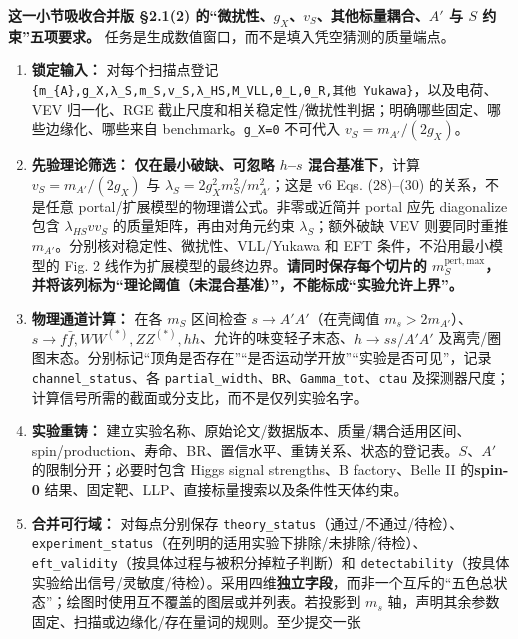 \documentclass[
]{article}
\providecommand{\tightlist}{%
  \setlength{\itemsep}{0pt}\setlength{\parskip}{0pt}}
\begin{document}
\textbf{这一小节吸收合并版 §2.1(2)
的``微扰性、\(g_X\)、\(v_S\)、其他标量耦合、\(A'\) 与 \(S\)
约束''五项要求。} 任务是生成数值窗口，而不是填入凭空猜测的质量端点。

\begin{enumerate}
\def\labelenumi{\arabic{enumi}.}
\tightlist
\item
  \textbf{锁定输入：} 对每个扫描点登记
  \texttt{\{m\_\{A\textquotesingle{}\},g\_X,λ\_S,m\_S,v\_S,λ\_HS,M\_VLL,θ\_L,θ\_R,其他\ Yukawa\}}，以及电荷、VEV
  归一化、RGE
  截止尺度和相关稳定性/微扰性判据；明确哪些固定、哪些边缘化、哪些来自
  benchmark。\texttt{g\_X=0} 不可代入 \(v_S=m_{A\prime}/(2g_X)\)。
\item
  \textbf{先验理论筛选：} \textbf{仅在最小破缺、可忽略 \(h\)--\(s\)
  混合基准下}，计算 \(v_S=m_{A'}/(2g_X)\) 与
  \(\lambda_S=2g_X^2m_S^2/m_{A'}^2\)；这是 v6 Eqs. (28)--(30)
  的关系，不是任意 portal/扩展模型的物理谱公式。非零或近简并 portal 应先
  diagonalize 包含 \(\lambda_{HS}vv_S\) 的质量矩阵，再由对角元约束
  \(\lambda_S\)；额外破缺 VEV 则要同时重推
  \(m_{A'}\)。分别核对稳定性、微扰性、VLL/Yukawa 和 EFT
  条件，不沿用最小模型的 Fig. 2
  线作为扩展模型的最终边界。\textbf{请同时保存每个切片的
  \(m_S^{\mathrm{pert,max}}\)，并将该列标为``理论阈值（未混合基准）''，不能标成``实验允许上界''。}
\item
  \textbf{物理通道计算：} 在各 \(m_S\) 区间检查 \(s\to A'A'\)（在壳阈值
  \(m_s>2m_{A'}\)）、\(s\to f\bar f,WW^{(*)},ZZ^{(*)},hh\)、允许的味变轻子末态、\(h\to ss/A'A'\)
  及离壳/圈图末态。分别标记``顶角是否存在''``是否运动学开放''``实验是否可见''，记录
  \texttt{channel\_status}、各
  \texttt{partial\_width}、\texttt{BR}、\texttt{Gamma\_tot}、\texttt{ctau}
  及探测器尺度；计算信号所需的截面或分支比，而不是仅列实验名字。
\item
  \textbf{实验重铸：}
  建立实验名称、原始论文/数据版本、质量/耦合适用区间、spin/production、寿命、BR、置信水平、重铸关系、状态的登记表。\(S\)、\(A'\)
  的限制分开；必要时包含 Higgs signal strengths、B factory、Belle II
  的\textbf{spin-0} 结果、固定靶、LLP、直接标量搜索以及条件性天体约束。
\item
  \textbf{合并可行域：} 对每点分别保存
  \texttt{theory\_status}（通过/不通过/待检）、\texttt{experiment\_status}（在列明的适用实验下排除/未排除/待检）、\texttt{eft\_validity}（按具体过程与被积分掉粒子判断）和
  \texttt{detectability}（按具体实验给出信号/灵敏度/待检）。采用四维\textbf{独立字段}，而非一个互斥的``五色总状态''；绘图时使用互不覆盖的图层或并列表。若投影到
  \(m_s\)
  轴，声明其余参数固定、扫描或边缘化/存在量词的规则。至少提交一张

\end{enumerate}
\end{document}
